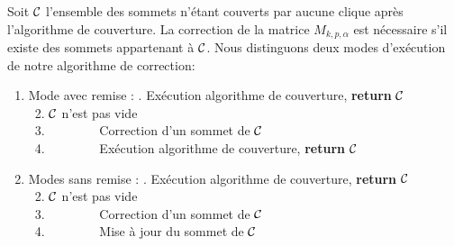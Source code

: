Soit ${\cal C}$ l'ensemble des sommets n'\'etant couverts par aucune clique apr\`es l'algorithme de couverture.
La correction de la matrice $M_{k,p,\alpha}$ est n\'ecessaire s'il existe des sommets appartenant \`a ${\cal C}$. 
\newline
Nous distinguons deux modes d'ex\'ecution de notre algorithme de correction:
\begin{enumerate}
	\item Mode avec remise :
				\newline
				. Ex\'ecution algorithme de couverture, {\bf return} ${\cal C}$ \\
				~2.  ${\cal C}$ n'est pas vide\\ 
				~3.	       	\indent~~~~~~~~Correction d'un sommet de ${\cal C}$  \\
				~4.	       	\indent~~~~~~~~Ex\'ecution algorithme de couverture, {\bf return} ${\cal C}$ \\
	\item Modes sans remise :
				\newline
				. Ex\'ecution algorithme de couverture, {\bf return} ${\cal C}$ \\
				~2.  ${\cal C}$ n'est pas vide\\ 
				~3.	       	\indent~~~~~~~~Correction d'un sommet de ${\cal C}$  \\
				~4.	       	\indent~~~~~~~~Mise \`a jour du sommet  de ${\cal C}$  \\
\end{enumerate}
